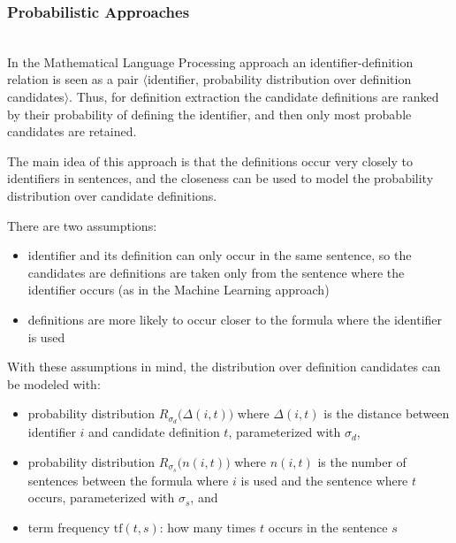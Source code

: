 \subsubsection{Probabilistic Approaches} \label{sec:mlp}

\ \\

In the Mathematical Language Processing approach \cite{pagael2014mlp}
an identifier-definition relation is seen as a pair $\langle$identifier, 
probability distribution over definition candidates$\rangle$. Thus, for
definition extraction the candidate definitions are ranked by
their probability of defining the identifier, 
and then only most probable candidates are retained.

The main idea of this approach is that the definitions occur very closely 
to identifiers in sentences, and the closeness can be used to
model the probability distribution over candidate definitions. 

There are two assumptions:

\begin{itemize}
\itemsep1pt\parskip0pt
  \item identifier and its definition can only occur in the same sentence, 
      so the candidates are definitions are taken only from the sentence where 
      the identifier occurs (as in the Machine Learning approach)
  \item definitions are more likely to occur closer to the formula 
      where the identifier is used
\end{itemize}

With these assumptions in mind, the distribution over definition candidates 
can be modeled with:

\begin{itemize}
\itemsep1pt\parskip0pt
  \item probability distribution $R_{\sigma_d}\big(\Delta(i, t) \big)$ where $\Delta(i, t)$
        is the distance between identifier $i$ and candidate definition $t$, 
        parameterized with $\sigma_d$,
  \item probability distribution $R_{\sigma_s}\big(n(i, t) \big)$ where $n(i, t)$ 
        is the number of sentences between the formula where $i$ is used 
        and the sentence where $t$ occurs, 
        parameterized with $\sigma_s$,
        and
  \item term frequency $\text{tf}(t, s)$: how many times $t$ occurs in the sentence $s$
\end{itemize}


